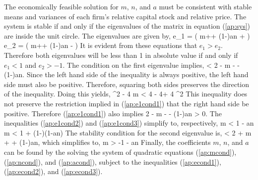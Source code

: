 The economically feasible solution for $m$, $n$, and $a$ must be consistent with stable means and variances of each firm's relative capital stock and relative price.  The system is stable if and only if the eigenvalues of the matrix in equation (\ref{ap:sys}) are inside the unit circle.  The eigenvalues are given by,
\bdm e_1 =  \left( m+\omega + (1-\omega)an +  \right) \edm
\bdm e_2 =  \left( m+\omega + (1-\omega)an -  \right) \edm
It is evident from these equations that $e_1 > e_2$.  Therefore both eigenvalues will be less than 1 in absolute value if and only if $e_1 < 1$ and $e_2 > -1$.  The condition on the first eigenvalue implies,
\beq \label{ap:e1cond1}  < 2 - m - \omega - (1-\omega)an. \eeq
Since the left hand side of the inequality is always positive, the left hand side must also be positive.  Therefore, squaring both sides preserves the direction of the inequality.  Doing this yields,
\beq \label{ap:e1cond2} ^2 - 4 m \omega < 4 - 4 + 4 ^2 \eeq
This inequality does not preserve the restriction implied in (\ref{ap:e1cond1}) that the right hand side be positive.  Therefore (\ref{ap:e1cond1}) also implies
\beq \label{ap:e1cond3} 2 - m - \omega - (1-\omega)an > 0. \eeq
The inequalities (\ref{ap:e1cond2}) and (\ref{ap:e1cond3}) simplify to, respectively,
\beq \label{ap:econd1} m < 1 - an \eeq
\beq \label{ap:econd2} m < 1 + (1-\omega)(1-an) \eeq
The stability condition for the second eigenvalue is,
\bdm {} < 2 + m + \omega + (1-\omega)an, \edm
which simplifies to,
\beq \label{ap:econd3} m > -1 -  an \eeq
Finally, the coefficients $m$, $n$, and $a$ can be found by the solving the system of quadratic equations (\ref{ap:mcond}), (\ref{ap:ncond}), and (\ref{ap:acond}), subject to the inequalities (\ref{ap:econd1}), (\ref{ap:econd2}), and (\ref{ap:econd3}).   

